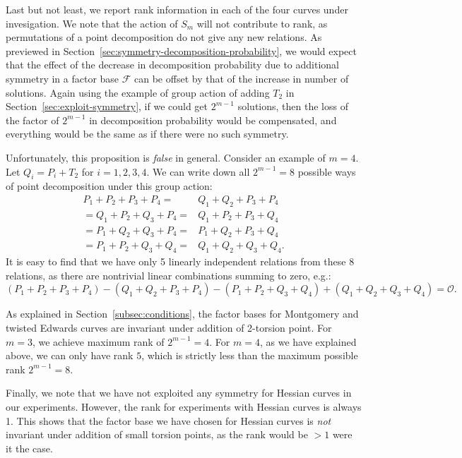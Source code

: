 Last but not least, we report rank information in each of the four
curves under invesigation.
%
We note that the action of $S_m$ will not contribute to rank, as
permutations of a point decomposition do not give any new relations.
%
As previewed in Section~\ref{sec:symmetry-decomposition-probability},
we would expect that the effect of the decrease in decomposition
probability due to additional symmetry in a factor base $\mathcal F$
can be offset by that of the increase in number of solutions.
%
Again using the example of group action of adding $T_2$ in
Section~\ref{sec:exploit-symmetry}, if we could get $2^{m-1}$
solutions, then the loss of the factor of $2^{m-1}$ in decomposition
probability would be compensated, and everything would be the same as
if there were no such symmetry.

Unfortunately, this proposition is \emph{false} in general.
%
Consider an example of $m=4$.
%
Let $Q_i=P_i+ T_2$ for $i=1,2,3,4$.
%
We can write down all $2^{m-1}=8$ possible ways of point decomposition
under this group action:
%
\[ \begin{aligned}
P_1 + P_2 + P_3 + P_4 = & Q_1 + Q_2 + P_3 + P_4 \\
= Q_1 + P_2 + Q_3 + P_4 = & Q_1 + P_2 + P_3 + Q_4 \\
= P_1 + Q_2 + Q_3 + P_4 = & P_1 + Q_2 + P_3 + Q_4 \\
= P_1 + P_2 + Q_3 + Q_4 = & Q_1 + Q_2 + Q_3 + Q_4.
\end{aligned} \]
%
It is easy to find that we have only 5 linearly independent relations
from these 8 relations, as there are nontrivial linear combinations
summing to zero, e.g.:
\[ (P_1 + P_2 + P_3 + P_4) - (Q_1 + Q_2 + P_3 + P_4) - (P_1 + P_2 +
  Q_3 + Q_4) + (Q_1 + Q_2 + Q_3 + Q_4) = \mathcal O.\]


As explained in Section~\ref{subsec:conditions}, the factor bases for
Montgomery and twisted Edwards curves are invariant under addition of
2-torsion point.
%
For $m=3$, we achieve maximum rank of $2^{m-1}=4$.
%
For $m=4$, as we have explained above, we can only have rank $5$, 
which is strictly less than the maximum possible rank $2^{m-1}=8$.

Finally, we note that we have not exploited any symmetry for Hessian
curves in our experiments.
%
However, the rank for experiments with Hessian curves is always 1.
%
This shows that the factor base we have chosen for Hessian curves is
\emph{not} invariant under addition of small torsion points, as the
rank would be $>1$ were it the case.





